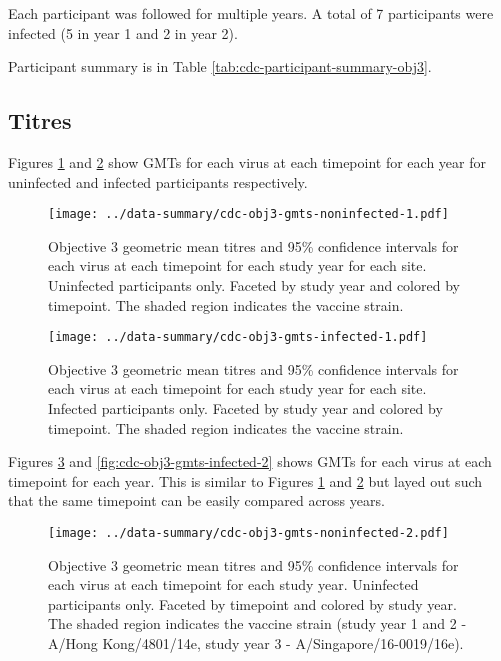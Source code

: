 \documentclass[12pt]{article}
\begin{document}
Each participant was followed for multiple years. A total of 7 participants
were infected (5 in year 1 and 2 in year 2).

Participant summary is in Table \ref{tab:cdc-participant-summary-obj3}.



\subsection{Titres}

Figures \ref{fig:cdc-obj3-gmts-noninfected-1} and \ref{fig:cdc-obj3-gmts-infected-1} show GMTs for each virus at each timepoint for each year for uninfected and infected participants respectively.

\begin{figure}
	\texttt{[image: ../data-summary/cdc-obj3-gmts-noninfected-1.pdf]}
	\caption{Objective 3 geometric mean titres and 95\% confidence intervals for each virus at each timepoint for each study year for each site. Uninfected participants only. Faceted by study year and colored by timepoint. The shaded region indicates the vaccine strain.}
	\label{fig:cdc-obj3-gmts-noninfected-1}
\end{figure}

\begin{figure}
	\texttt{[image: ../data-summary/cdc-obj3-gmts-infected-1.pdf]}
	\caption{Objective 3 geometric mean titres and 95\% confidence intervals for each virus at each timepoint for each study year for each site. Infected participants only. Faceted by study year and colored by timepoint. The shaded region indicates the vaccine strain.}
	\label{fig:cdc-obj3-gmts-infected-1}
\end{figure}

Figures \ref{fig:cdc-obj3-gmts-noninfected-2} and \ref{fig:cdc-obj3-gmts-infected-2} shows GMTs for each virus at each timepoint for each year. This is similar to Figures \ref{fig:cdc-obj3-gmts-noninfected-1} and \ref{fig:cdc-obj3-gmts-infected-1} but layed out such that the same timepoint can be easily compared across years.

\begin{figure}
	\texttt{[image: ../data-summary/cdc-obj3-gmts-noninfected-2.pdf]}
	\caption{Objective 3 geometric mean titres and 95\% confidence intervals for each virus at each timepoint for each study year. Uninfected participants only. Faceted by timepoint and colored by study year. The shaded region indicates the vaccine strain (study year 1 and 2 - A/Hong Kong/4801/14e, study year 3 - A/Singapore/16-0019/16e).}
	\label{fig:cdc-obj3-gmts-noninfected-2}
\end{figure}
\end{document}
